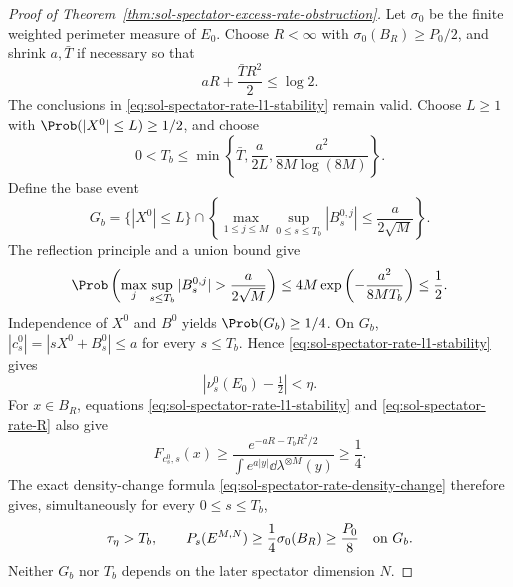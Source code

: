 \documentclass[../main.tex]{subfiles}
\begin{document}
\begin{proof}[Proof of Theorem~\ref{thm:sol-spectator-excess-rate-obstruction}]
Let $\sigma_0$ be the finite weighted perimeter measure of $E_0$.  Choose $R<\infty$ with
$\sigma_0(B_R)\ge P_0/2$, and shrink $a,\bar T$ if necessary so that
\begin{equation}
  aR+\frac{\bar T R^2}{2}\le\log2.
  \label{eq:sol-spectator-rate-R}
\end{equation}
The conclusions in \eqref{eq:sol-spectator-rate-l1-stability} remain valid.  Choose $L\ge1$
with $\Prob(|X^0|\le L)\ge1/2$, and choose
\begin{equation}
  0<T_b\le
  \min\left\{\bar T,\frac{a}{2L},
  \frac{a^2}{8M\log(8M)}\right\}.
  \label{eq:sol-spectator-rate-Tb}
\end{equation}
Define the base event
\begin{equation}
  G_b=\{|X^0|\le L\}\cap
  \left\{
    \max_{1\le j\le M}\sup_{0\le s\le T_b}|B_s^{0,j}|
    \le\frac{a}{2\sqrt M}
  \right\}.
  \label{eq:sol-spectator-rate-Gb}
\end{equation}
The reflection principle and a union bound give
\[
  \Prob\left(
    \max_j\sup_{s\le T_b}|B_s^{0,j}|>\frac{a}{2\sqrt M}
  \right)
  \le4M\exp\left(-\frac{a^2}{8MT_b}\right)\le\frac12.
\]
Independence of $X^0$ and $B^0$ yields $\Prob(G_b)\ge1/4$.  On $G_b$,
$|c_s^0|=|sX^0+B_s^0|\le a$ for every $s\le T_b$.  Hence
\eqref{eq:sol-spectator-rate-l1-stability} gives
\[
  |\nu_s^0(E_0)-\tfrac12|<\eta.
\]
For $x\in B_R$, equations \eqref{eq:sol-spectator-rate-l1-stability} and
\eqref{eq:sol-spectator-rate-R} also give
\[
  F_{c_s^0,s}(x)
  \ge
  \frac{e^{-aR-T_bR^2/2}}
       {\int e^{a|y|}\dd\lambda^{\otimes M}(y)}
  \ge\frac14.
\]
The exact density-change formula \eqref{eq:sol-spectator-rate-density-change} therefore gives,
simultaneously for every $0\le s\le T_b$,
\begin{equation}
  \tau_\eta>T_b,
  \qquad
  P_s(E^{M,N})\ge\frac14\sigma_0(B_R)\ge\frac{P_0}{8}
  \quad\hbox{on }G_b.
  \label{eq:sol-spectator-rate-base-stability}
\end{equation}
Neither $G_b$ nor $T_b$ depends on the later spectator dimension $N$.


\end{proof}
\end{document}
